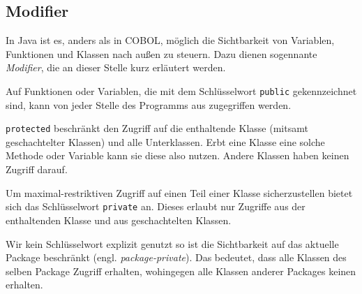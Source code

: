 \subsection{Modifier}
In Java ist es, anders als in COBOL, möglich die Sichtbarkeit von Variablen, Funktionen und Klassen nach außen zu steuern. Dazu dienen sogennante \textit{Modifier}, die an dieser Stelle kurz erläutert werden.

Auf Funktionen oder Variablen, die mit dem Schlüsselwort \texttt{public} gekennzeichnet sind, kann von jeder Stelle des Programms aus zugegriffen werden.

\texttt{protected} beschränkt den Zugriff auf die enthaltende Klasse (mitsamt geschachtelter Klassen) und alle Unterklassen. Erbt eine Klasse eine solche Methode oder Variable kann sie diese also nutzen. Andere Klassen haben keinen Zugriff darauf.

Um maximal-restriktiven Zugriff auf einen Teil einer Klasse sicherzustellen bietet sich das Schlüsselwort \texttt{private} an. Dieses erlaubt nur Zugriffe aus der enthaltenden Klasse und aus geschachtelten Klassen.

Wir kein Schlüsselwort explizit genutzt so ist die Sichtbarkeit auf das aktuelle Package beschränkt (engl. \textit{package-private}). Das bedeutet, dass alle Klassen des selben Package Zugriff erhalten, wohingegen alle Klassen anderer Packages keinen erhalten.